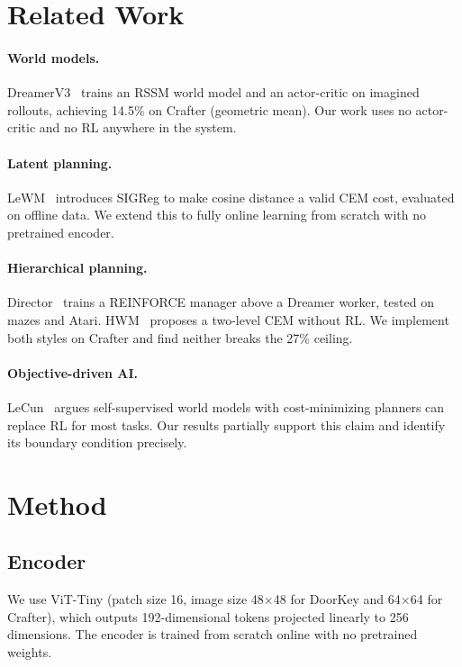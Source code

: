 \documentclass[12pt]{article}
\begin{document}
\section{Related Work}

\paragraph{World models.} DreamerV3~\cite{hafner2023dreamerv3} trains an RSSM world model and an actor-critic on imagined rollouts, achieving 14.5\% on Crafter (geometric mean). Our work uses no actor-critic and no RL anywhere in the system.

\paragraph{Latent planning.} LeWM~\cite{yarats2025lewm} introduces SIGReg to make cosine distance a valid CEM cost, evaluated on offline data. We extend this to fully online learning from scratch with no pretrained encoder.

\paragraph{Hierarchical planning.} Director~\cite{hafner2022director} trains a REINFORCE manager above a Dreamer worker, tested on mazes and Atari. HWM~\cite{hwm2025} proposes a two-level CEM without RL. We implement both styles on Crafter and find neither breaks the 27\% ceiling.

\paragraph{Objective-driven AI.} LeCun~\cite{lecun2022path} argues self-supervised world models with cost-minimizing planners can replace RL for most tasks. Our results partially support this claim and identify its boundary condition precisely.

\section{Method}

\subsection{Encoder}

We use ViT-Tiny (patch size 16, image size 48$\times$48 for DoorKey and 64$\times$64 for Crafter), which outputs 192-dimensional tokens projected linearly to 256 dimensions. The encoder is trained from scratch online with no pretrained weights.
\end{document}
